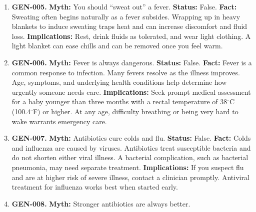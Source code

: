 \documentclass[11pt,oneside]{book}
\begin{document}
\begin{enumerate}[leftmargin=0pt,labelwidth=0pt,labelsep=0pt,itemindent=0pt]
\textbf{Status:} False.\newline
\textbf{Fact:} Nasal mucus can turn yellow or green during an ordinary viral cold. Color alone cannot identify the cause of the illness or show that an antibiotic would help.\newline
\textbf{Implications:} How symptoms change over time is more informative. Seek medical advice if sinus symptoms persist for at least ten days without improvement, become severe, or worsen after initially improving. \cite{ref294,ref241}
\item[] \textbf{GEN-005.} \textbf{Myth:} You should ``sweat out'' a fever.\newline
\textbf{Status:} False.\newline
\textbf{Fact:} Sweating often begins naturally as a fever subsides. Wrapping up in heavy blankets to induce sweating traps heat and can increase discomfort and fluid loss.\newline
\textbf{Implications:} Rest, drink fluids as tolerated, and wear light clothing. A light blanket can ease chills and can be removed once you feel warm. \cite{ref295}
\item[] \textbf{GEN-006.} \textbf{Myth:} Fever is always dangerous.\newline
\textbf{Status:} False.\newline
\textbf{Fact:} Fever is a common response to infection. Many fevers resolve as the illness improves. Age, symptoms, and underlying health conditions help determine how urgently someone needs care.\newline
\textbf{Implications:} Seek prompt medical assessment for a baby younger than three months with a rectal temperature of 38$^\circ$C (100.4$^\circ$F) or higher. At any age, difficulty breathing or being very hard to wake warrants emergency care. \cite{ref295}
\item[] \textbf{GEN-007.} \textbf{Myth:} Antibiotics cure colds and flu.\newline
\textbf{Status:} False.\newline
\textbf{Fact:} Colds and influenza are caused by viruses. Antibiotics treat susceptible bacteria and do not shorten either viral illness. A bacterial complication, such as bacterial pneumonia, may need separate treatment.\newline
\textbf{Implications:} If you suspect flu and are at higher risk of severe illness, contact a clinician promptly. Antiviral treatment for influenza works best when started early. \cite{ref294,ref242}
\item[] \textbf{GEN-008.} \textbf{Myth:} Stronger antibiotics are always better.\newline

\end{enumerate}
\end{document}
